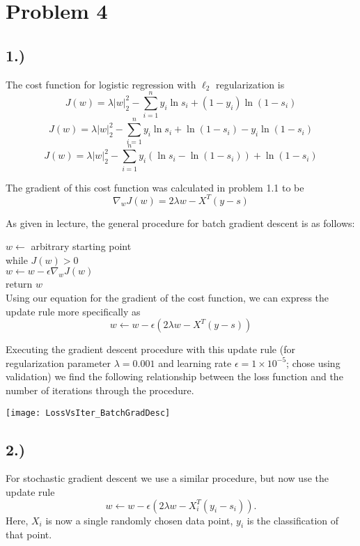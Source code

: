 \documentclass{report}
\newcommand{\tab}{\-\hspace{1.5cm}}
\begin{document}
\section*{Problem 4}

\subsection*{1.)}

The cost function for logistic regression with $\ell_2$ regularization is
$$ J(w) = \lambda |w|_2^2 - \sum_{i=1}^n{ y_i \ln s_i + (1-y_i) \ln (1-s_i)} $$
$$ J(w) = \lambda |w|_2^2 - \sum_{i=1}^n{ y_i \ln s_i + \ln (1-s_i) - y_i \ln (1-s_i)} $$
$$ J(w) = \lambda |w|_2^2 - \sum_{i=1}^n{ y_i(\ln s_i - \ln (1-s_i)) + \ln (1-s_i) } $$

The gradient of this cost function was calculated in problem 1.1 to be
$$ \nabla_w J(w) = 2 \lambda w - X^T(y-s) $$

As given in lecture, the general procedure for batch gradient descent is as follows:

\tab $w \leftarrow$ arbitrary starting point \\
\tab while $J(w) > 0 $ \\
\tab \tab $w \leftarrow w - \epsilon \nabla_w J(w)$ \\
\tab return $w$ \\

Using our equation for the gradient of the cost function, we can express the update rule more specifically as
$$ w \leftarrow w - \epsilon(2 \lambda w - X^T(y-s)) $$

Executing the gradient descent procedure with this update rule (for regularization parameter $\lambda = 0.001$ and learning rate $\epsilon = 1\times10^{-5}$; chose using validation) we find the following relationship between the loss function and the number of iterations through the procedure.\\
\begin{center}
\texttt{[image: LossVsIter\_BatchGradDesc]}
\end{center}

\subsection*{2.)}

For stochastic gradient descent we use a similar procedure, but now use the update rule 
$$ w \leftarrow w - \epsilon(2 \lambda w - X_i^T(y_i-s_i)). $$
Here, $X_i$ is now a single randomly chosen data point, $y_i$ is the classification of that point.
\end{document}
